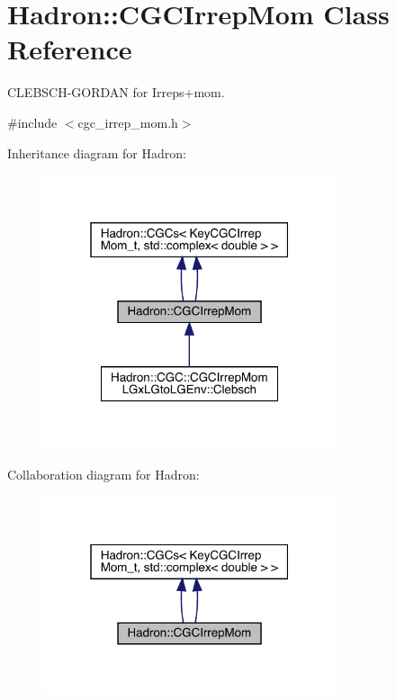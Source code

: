 \hypertarget{classHadron_1_1CGCIrrepMom}{}\section{Hadron\+:\+:C\+G\+C\+Irrep\+Mom Class Reference}
\label{classHadron_1_1CGCIrrepMom}


C\+L\+E\+B\+S\+C\+H-\/\+G\+O\+R\+D\+AN for Irreps+mom.  




{\ttfamily \#include $<$cgc\+\_\+irrep\+\_\+mom.\+h$>$}



Inheritance diagram for Hadron\+:\nopagebreak
\begin{figure}[H]
\begin{center}
\leavevmode
\includegraphics[width=244pt]{df/d13/classHadron_1_1CGCIrrepMom__inherit__graph}
\end{center}
\end{figure}


Collaboration diagram for Hadron\+:\nopagebreak
\begin{figure}[H]
\begin{center}
\leavevmode
\includegraphics[width=244pt]{d9/dea/classHadron_1_1CGCIrrepMom__coll__graph}
\end{center}
\end{figure}
